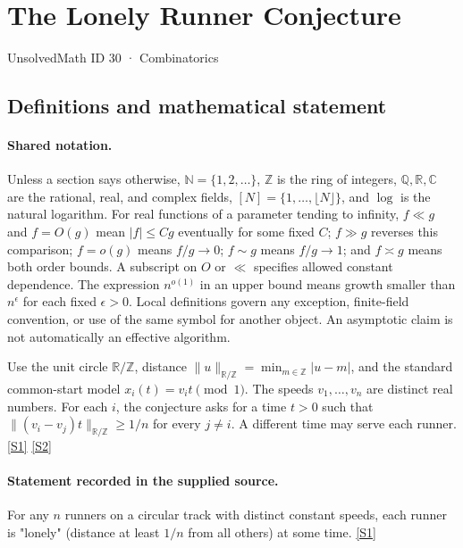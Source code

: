 \documentclass[11pt,a4paper]{article}
\newcommand{\N}{\mathbb{N}}
\newcommand{\Z}{\mathbb{Z}}
\newcommand{\Q}{\mathbb{Q}}
\newcommand{\R}{\mathbb{R}}
\newcommand{\C}{\mathbb{C}}
\newcommand{\sref}[2]{\hyperlink{source:#1:#2}{[S#2]}}
\begin{document}

\setcounter{section}{29}

\section{The Lonely Runner Conjecture}\label{30}

{\small\sffamily UnsolvedMath ID 30 · Combinatorics}

\subsection{Definitions and mathematical statement}

\paragraph{Shared notation.}Unless a section says otherwise, $\N=\{1,2,\ldots\}$,
$\Z$ is the ring of integers, $\Q,\R,\C$ are the rational, real, and complex
fields, $[N]=\{1,\ldots,\lfloor N\rfloor\}$, and $\log$ is the natural
logarithm. For real functions of a parameter tending to infinity,
$f\ll g$ and $f=O(g)$ mean $|f|\leq Cg$ eventually for some fixed $C$;
$f\gg g$ reverses this comparison; $f=o(g)$ means $f/g\to0$;
$f\sim g$ means $f/g\to1$; and $f\asymp g$ means both order bounds.
A subscript on $O$ or $\ll$ specifies allowed constant dependence.
The expression $n^{o(1)}$ in an upper bound means growth smaller than
$n^\epsilon$ for each fixed $\epsilon>0$. Local definitions govern any
exception, finite-field convention, or use of the same symbol for another
object. An asymptotic claim is not automatically an effective algorithm.



Use the unit circle $\R/\Z$, distance $\|u\|_{\R/\Z}=\min_{m\in\Z}|u-m|$, and the standard common-start model $x_i(t)=v_it\pmod1$. The speeds $v_1,\ldots,v_n$ are distinct real numbers. For each $i$, the conjecture asks for a time $t>0$ such that $\|(v_i-v_j)t\|_{\R/\Z}\geq1/n$ for every $j\ne i$. A different time may serve each runner. \sref{30}{1} \sref{30}{2}

\paragraph{Statement recorded in the supplied source.}
For any $n$ runners on a circular track with distinct constant speeds, each runner is "lonely" (distance at least $1/n$ from all others) at some time. \sref{30}{1}
\end{document}

